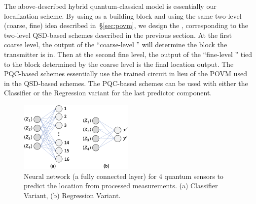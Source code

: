
The above-described hybrid quantum-classical model is essentially our \pqcone localization scheme.
By using \pqcone as a building block and using the same two-level (coarse, fine) idea described in~\S\ref{sec:povm}, we design the \pqctwo, corresponding to the two-level QSD-based schemes described in the previous section.
At the first coarse level, the output of the ``coarse-level \pqcone'' will determine the block the transmitter is in.
Then at the second fine level, the output of the ``fine-level \pqcone'' tied to the block determined by the coarse level is the final location output.
The PQC-based schemes essentially use the trained circuit in lieu of the POVM used in the QSD-based schemes. 
The PQC-based schemes can be used with either the Classifier or the Regression variant
for the last predictor component. 




\begin{figure}
    \centering
    \includegraphics[width=0.5\textwidth]{chapters/qce/figures/fclayer.png}
    \caption{Neural network (a fully connected layer) for 4 quantum sensors to predict the location from processed measurements. (a) Classifier Variant, (b) Regression Variant.}
    \label{fig:fclayer}
\end{figure}




